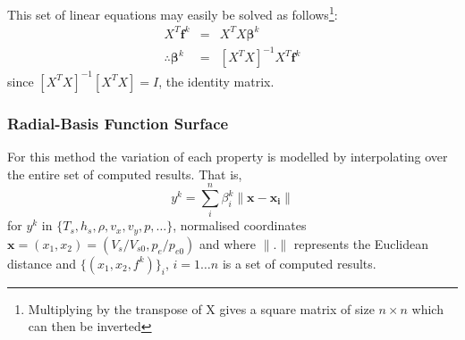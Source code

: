 This set of linear equations may easily be solved as follows\footnote{Multiplying by the transpose of X gives a square matrix of size $n \times n$ which can then be inverted}: 
\begin{eqnarray}
X^T\mathbf{f}^k &=& X^TX\boldsymbol{\beta}^k  \nonumber \\
\therefore \boldsymbol{\beta}^k &=& [X^TX]^{-1}X^T\mathbf{f}^k
\end{eqnarray}
since $[X^TX]^{-1}[X^TX] = I$, the identity matrix.


\subsubsection{Radial-Basis Function Surface}
For this method the variation of each property is modelled by interpolating over the entire set of computed results. That is,
\begin{equation}
y^k = \sum_i^n{\beta_i^k \parallel \mathbf{x} - \mathbf{x_i} \parallel}
\label{radial}
\end{equation}
for $y^k$ in $\lbrace T_s, h_s, \rho, v_x, v_y, p, \dots \rbrace$, normalised coordinates $\mathbf{x} = (x_1, x_2) = (V_s/V_{s0}, p_e/p_{e0})$ and where $\parallel . \parallel$ represents the Euclidean distance and $\lbrace (x_1, x_2, f^k) \rbrace_i$, $i = 1 \dots n$ is a set of computed results. 

